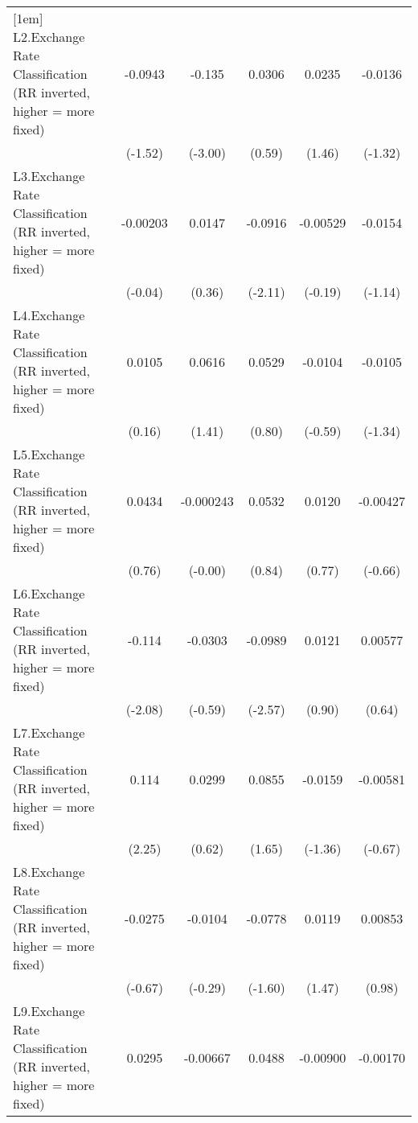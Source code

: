 {\begin{tabular*}{\linewidth}{@{\hskip\tabcolsep\extracolsep\fill}l*{5}{c}}
[1em]
L2.Exchange Rate Classification (RR inverted, higher = more fixed)&  -0.0943         &   -0.135\sym{**} &   0.0306         &   0.0235         &  -0.0136         \\
                &  (-1.52)         &  (-3.00)         &   (0.59)         &   (1.46)         &  (-1.32)         \\
[1em]
L3.Exchange Rate Classification (RR inverted, higher = more fixed)& -0.00203         &   0.0147         &  -0.0916\sym{*}  & -0.00529         &  -0.0154         \\
                &  (-0.04)         &   (0.36)         &  (-2.11)         &  (-0.19)         &  (-1.14)         \\
[1em]
L4.Exchange Rate Classification (RR inverted, higher = more fixed)&   0.0105         &   0.0616         &   0.0529         &  -0.0104         &  -0.0105         \\
                &   (0.16)         &   (1.41)         &   (0.80)         &  (-0.59)         &  (-1.34)         \\
[1em]
L5.Exchange Rate Classification (RR inverted, higher = more fixed)&   0.0434         &-0.000243         &   0.0532         &   0.0120         & -0.00427         \\
                &   (0.76)         &  (-0.00)         &   (0.84)         &   (0.77)         &  (-0.66)         \\
[1em]
L6.Exchange Rate Classification (RR inverted, higher = more fixed)&   -0.114\sym{*}  &  -0.0303         &  -0.0989\sym{*}  &   0.0121         &  0.00577         \\
                &  (-2.08)         &  (-0.59)         &  (-2.57)         &   (0.90)         &   (0.64)         \\
[1em]
L7.Exchange Rate Classification (RR inverted, higher = more fixed)&    0.114\sym{*}  &   0.0299         &   0.0855         &  -0.0159         & -0.00581         \\
                &   (2.25)         &   (0.62)         &   (1.65)         &  (-1.36)         &  (-0.67)         \\
[1em]
L8.Exchange Rate Classification (RR inverted, higher = more fixed)&  -0.0275         &  -0.0104         &  -0.0778         &   0.0119         &  0.00853         \\
                &  (-0.67)         &  (-0.29)         &  (-1.60)         &   (1.47)         &   (0.98)         \\
[1em]
L9.Exchange Rate Classification (RR inverted, higher = more fixed)&   0.0295         & -0.00667         &   0.0488         & -0.00900         & -0.00170         \\

\end{tabular*}}
